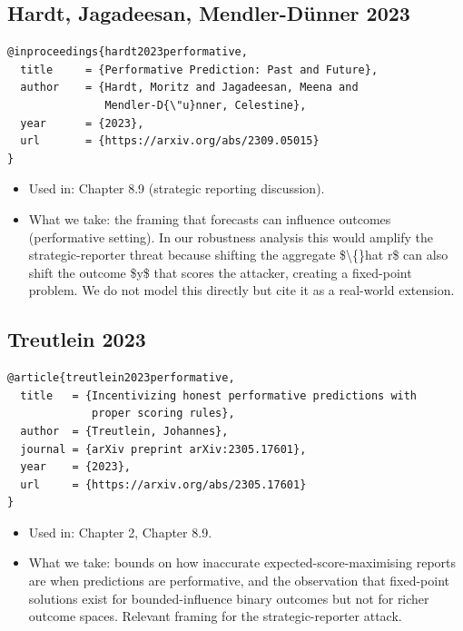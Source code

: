 \documentclass[11pt,a4paper,openany]{report}
\begin{document}
\subsection{Hardt, Jagadeesan, Mendler-Dünner 2023}

\begin{verbatim}
@inproceedings{hardt2023performative,
  title     = {Performative Prediction: Past and Future},
  author    = {Hardt, Moritz and Jagadeesan, Meena and
               Mendler-D{\"u}nner, Celestine},
  year      = {2023},
  url       = {https://arxiv.org/abs/2309.05015}
}
\end{verbatim}

\begin{itemize}
  \item Used in: Chapter 8.9 (strategic reporting discussion).
  \item What we take: the framing that forecasts can influence outcomes
    (performative setting). In our robustness analysis this would
    amplify the strategic-reporter threat because shifting the aggregate
    \$\textbackslash\{\}hat r\$ can also shift the outcome \$y\$ that scores the attacker,
    creating a fixed-point problem. We do not model this directly but
    cite it as a real-world extension.
\end{itemize}

\subsection{Treutlein 2023}

\begin{verbatim}
@article{treutlein2023performative,
  title   = {Incentivizing honest performative predictions with
             proper scoring rules},
  author  = {Treutlein, Johannes},
  journal = {arXiv preprint arXiv:2305.17601},
  year    = {2023},
  url     = {https://arxiv.org/abs/2305.17601}
}
\end{verbatim}

\begin{itemize}
  \item Used in: Chapter 2, Chapter 8.9.
  \item What we take: bounds on how inaccurate expected-score-maximising
    reports are when predictions are performative, and the observation
    that fixed-point solutions exist for bounded-influence binary
    outcomes but not for richer outcome spaces. Relevant framing for
    the strategic-reporter attack.
\end{itemize}
\end{document}
